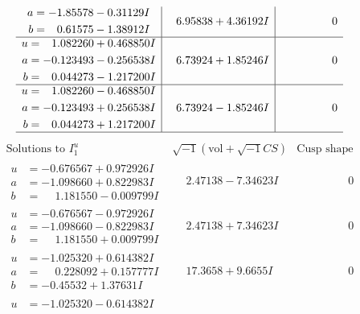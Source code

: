 \documentclass[1p]{elsarticle_modified}
\theoremstyle{definition}
\newcommand{\I}{\sqrt{-1}}
\begin{document}
$$\begin{array}{c|c|c}
\begin{aligned}
a &= -1.85578 - 0.31129 I \\
b &= \phantom{-}0.61575 - 1.38912 I\end{aligned}
 & \phantom{-}6.95838 + 4.36192 I & \phantom{-0.000000 } 0 \\ \hline\begin{aligned}
u &= \phantom{-}1.082260 + 0.468850 I \\
a &= -0.123493 - 0.256538 I \\
b &= \phantom{-}0.044273 - 1.217200 I\end{aligned}
 & \phantom{-}6.73924 + 1.85246 I & \phantom{-0.000000 } 0 \\ \hline\begin{aligned}
u &= \phantom{-}1.082260 - 0.468850 I \\
a &= -0.123493 + 0.256538 I \\
b &= \phantom{-}0.044273 + 1.217200 I\end{aligned}
 & \phantom{-}6.73924 - 1.85246 I & \phantom{-0.000000 } 0\\
 \hline 
 \end{array}$$\newpage$$\begin{array}{c|c|c}  
\text{Solutions to }I^u_{1}& \I (\text{vol} + \sqrt{-1}CS) & \text{Cusp shape}\\
 \hline 
\begin{aligned}
u &= -0.676567 + 0.972926 I \\
a &= -1.098660 + 0.822983 I \\
b &= \phantom{-}1.181550 - 0.009799 I\end{aligned}
 & \phantom{-}2.47138 - 7.34623 I & \phantom{-0.000000 } 0 \\ \hline\begin{aligned}
u &= -0.676567 - 0.972926 I \\
a &= -1.098660 - 0.822983 I \\
b &= \phantom{-}1.181550 + 0.009799 I\end{aligned}
 & \phantom{-}2.47138 + 7.34623 I & \phantom{-0.000000 } 0 \\ \hline\begin{aligned}
u &= -1.025320 + 0.614382 I \\
a &= \phantom{-}0.228092 + 0.157777 I \\
b &= -0.45532 + 1.37631 I\end{aligned}
 & \phantom{-}17.3658 + 9.6655 I & \phantom{-0.000000 } 0 \\ \hline\begin{aligned}
u &= -1.025320 - 0.614382 I \\

\end{aligned}
\end{array}$$
\end{document}

